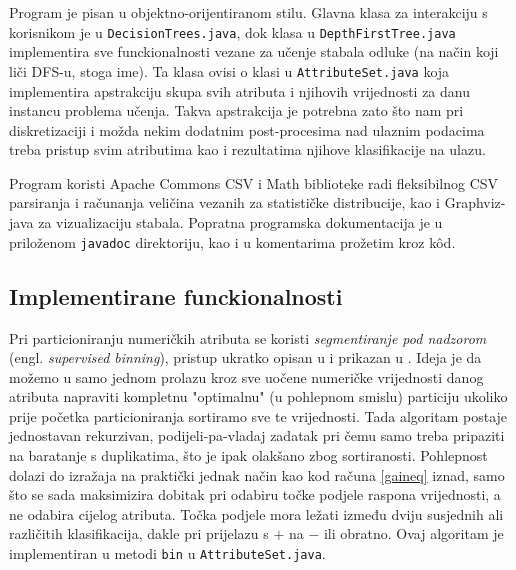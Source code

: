 \documentclass[12pt,a4paper]{article}
\begin{document}
Program je pisan u objektno-orijentiranom stilu. Glavna klasa za interakciju s korisnikom je u \texttt{DecisionTrees.java}, 
dok klasa u \texttt{DepthFirstTree.java} implementira sve funckionalnosti vezane za učenje stabala odluke (na način koji liči DFS-u, stoga ime).
Ta klasa ovisi o klasi u \texttt{AttributeSet.java} koja implementira apstrakciju skupa svih atributa i njihovih vrijednosti za danu instancu
problema učenja. Takva apstrakcija je potrebna zato što nam pri diskretizaciji i možda nekim dodatnim post-procesima nad ulaznim podacima
treba pristup svim atributima kao i rezultatima njihove klasifikacije na ulazu.

Program koristi Apache Commons CSV i Math biblioteke radi fleksibilnog CSV parsiranja i računanja veličina vezanih za 
statističke distribucije, kao i Graphviz-java za vizualizaciju stabala. Popratna programska dokumentacija je u priloženom \texttt{javadoc}
direktoriju, kao i u komentarima prožetim kroz k\^od.

\subsection{Implementirane funckionalnosti}
Pri particioniranju numeričkih atributa se koristi \emph{segmentiranje pod nadzorom} (engl. \textit{supervised binning}),
pristup ukratko opisan u \cite{rn} i prikazan
u \cite{gaineq}. Ideja je da možemo u samo jednom prolazu kroz sve uočene numeričke vrijednosti danog atributa
 napraviti kompletnu "optimalnu" (u pohlepnom smislu) particiju ukoliko prije početka particioniranja sortiramo sve te vrijednosti.
 Tada algoritam postaje jednostavan rekurzivan, podijeli-pa-vladaj zadatak pri čemu samo treba pripaziti na baratanje s duplikatima,
 što je ipak olakšano zbog sortiranosti. Pohlepnost dolazi do izražaja na praktički jednak način kao kod računa \eqref{gaineq} iznad,
 samo što se sada maksimizira dobitak pri odabiru točke podjele raspona vrijednosti, a ne odabira cijelog atributa. Točka podjele mora
 ležati između dviju susjednih ali različitih klasifikacija, dakle pri prijelazu s $+$ na $-$ ili obratno. Ovaj algoritam je
implementiran u metodi \texttt{bin} u \texttt{AttributeSet.java}.
\end{document}
